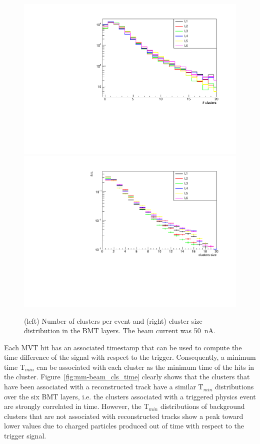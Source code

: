 \begin{figure}[!htb]
 \includegraphics[width=.49\columnwidth,keepaspectratio]{images/beam_num_cls.pdf}
 \includegraphics[width=.49\columnwidth,keepaspectratio]{images/beam_cls_size.pdf}
 \caption{(left) Number of clusters per event and (right) cluster size distribution in the BMT layers. The beam current was 50~nA.}
 \label{fig:mm-beam_cls}
\end{figure}

Each MVT hit has an associated timestamp that can be used to compute the time difference of the signal with respect to the
trigger. Consequently, a minimum time T$_{min}$ can be associated with each cluster as the minimum time of the hits in the cluster.
Figure~\ref{fig:mm-beam_cls_time} clearly shows that the clusters that have been associated with a reconstructed track have
a similar T$_{min}$ distributions over the six BMT layers, i.e. the clusters associated with a triggered physics event are strongly
correlated in time. However, the T$_{min}$ distributions of background clusters that are not associated with reconstructed tracks
show a peak toward lower values due to charged particles produced out of time with respect to the trigger signal.

